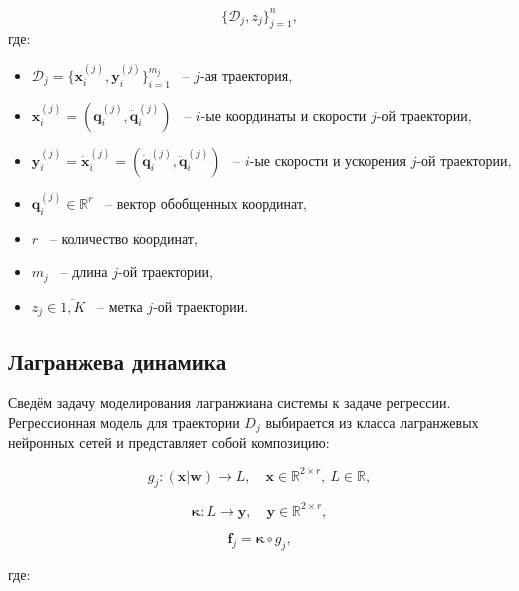 \documentclass[12pt, twoside]{article}
\begin{document}
    $$\{ \mathcal{D}_j, z_j\}_{j=1}^n,$$ 
    где:
    \begin{itemize}

        \item[] $\mathcal{D}_j = \{ \mathbf{x}_i^{(j)}, \mathbf{y}_i^{(j)} \}_{i=1}^{m_j}$ ~-- $j$-ая траектория,

        \item[] $\mathbf{x}_i^{(j)} = (\mathbf{q}_i^{(j)}, \mathbf{\dot{q}}_i^{(j)})$ ~--  $i$-ые координаты и скорости $j$-ой траектории, 

        \item[] $\mathbf{y}_i^{(j)} = \mathbf{\dot{x}}_i^{(j)} = (\mathbf{\dot{q}}_i^{(j)}, \mathbf{\ddot{q}}_i^{(j)})$ ~--  $i$-ые скорости и ускорения $j$-ой траектории, 

        \item[] $\mathbf{q}_i^{(j)} \in \mathbb{R}^r$ ~-- вектор обобщенных координат,

        \item[] $r$ ~-- количество координат,

        \item[] $m_j$ ~-- длина $j$-ой траектории,

        \item[] $z_j \in \overline{1, K}$ ~-- метка $j$-ой траектории.
        
    \end{itemize}
        
    \subsection{Лагранжева динамика}\label{subsec:lagdyn}
    

        Сведём задачу моделирования лагранжиана системы к задаче регрессии. Регрессионная модель для траектории $D_j$ выбирается из класса лагранжевых нейронных сетей и представляет собой композицию:

        $$g_j \colon (\mathbf{x} | \mathbf{w}) \to L, \quad \mathbf{x} \in \mathbb{R}^{2 \times r},\  L \in \mathbb{R},$$

        $$ \mathbf{\kappa}: L \to \mathbf{y}, \quad \mathbf{y} \in \mathbb{R}^{2 \times r},$$


        $$ \mathbf{f}_j = \mathbf{\kappa} \circ g_j,$$
        
        где: 
    
\end{document}
